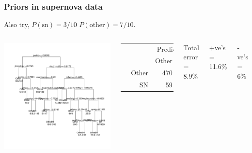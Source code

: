 \documentclass{beamer}
\begin{document}
\begin{frame}
	\frametitle{Priors in supernova data}
	Also try, $P(\text{sn}) = 3/10$ $P(\text{other}) = 7/10$.
	\begin{columns}[c] 
			\includegraphics{treep4.pdf}
				\begin{table}
				\begin{tabular}{cr|rr}
				& & \multicolumn{2}{c}{Prediction}\\
				& & Other & SN\\
				\hline
				\multirow{2}{*}{\rotatebox{90}{Actual}} & Other &  470 &  30\\
				& SN & 59 &  441\\
				\end{tabular}
				\end{table}	
				Total error = 8.9\%
				
				+ve's = 11.6\%
				
				-ve's = 6\%
			\end{columns}
\end{frame}
\end{document}
